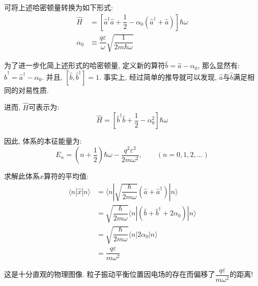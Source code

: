 \documentclass[a4paper, 11pt]{article}
\begin{document}
\begin{spacing}{1.2}
        可将上述哈密顿量转换为如下形式:
        \begin{equation}
          \begin{aligned}
            \hat{H} &= \left[\hat{a}^{\dagger}\hat{a}+\dfrac{1}{2}-\alpha_0\left(\hat{a}^{\dagger}%
            +\hat{a}\right)\right]\hbar\omega\\
            \alpha_0 &\equiv \dfrac{q\varepsilon}{\omega}\sqrt{\dfrac{1}{2m\hbar\omega}}
          \end{aligned}
        \end{equation}

        为了进一步化简上述形式的哈密顿量, 定义新的算符$\hat{b} = \hat{a}-\alpha_0$, 那么显然有:
        $\hat{b}^{\dagger} = \hat{a}^{\dagger} - \alpha_0$. 并且, $[\hat{b}, \hat{b}^{\dagger}] = 1$.
        事实上, 经过简单的推导就可以发现, $\hat{a}$与$\hat{b}$满足相同的对易性质. 

        进而, $\hat{H}$可表示为:
        \begin{equation}
          \hat{H} = \left[\hat{b}^{\dagger}\hat{b}+\dfrac{1}{2}-\alpha_0^2\right]\hbar\omega
        \end{equation}

        因此, 体系的本征能量为:
        \begin{equation}
          E_n = \left(n+\dfrac{1}{2}\right)\hbar\omega-\dfrac{q^2\varepsilon^2}{2m\omega^2}, \qquad(n=0,1,2,\ldots)
        \end{equation} 

        求解此体系$\hat{x}$算符的平均值:
        \begin{equation}
          \begin{aligned}
            \langle{}n|\hat{x}|n\rangle &= \langle{}n|\sqrt{\dfrac{\hbar}{2m\omega}}
                                   \left(\hat{a}+\hat{a}^{\dagger}\right)|n\rangle \\
                                   &= \sqrt{\dfrac{\hbar}{2m\omega}}\langle{}n|
                                   \left(\hat{b}+\hat{b}^{\dagger}+2\alpha_0\right)|n\rangle\\
                                   &= \sqrt{\dfrac{\hbar}{2m\omega}}\langle{}n|
                                   2\alpha_0|n\rangle\\
                                   &= \dfrac{q\varepsilon}{m\omega^2}
          \end{aligned}
        \end{equation}

        这是十分直观的物理图像. 粒子振动平衡位置因电场的存在而偏移了$\dfrac{q\varepsilon}{m\omega^2}$的距离!


\end{spacing}
\end{document}
